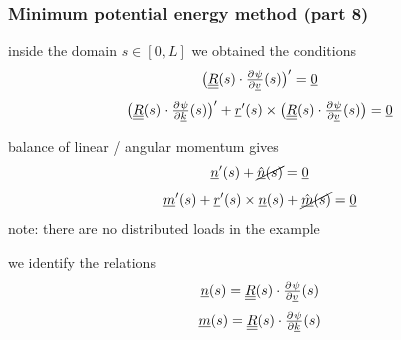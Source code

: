 \begin{frame}
  \frametitle{Minimum potential energy method (part 8)}
  
  inside the domain $s \in [0,L]$ we obtained the conditions
  \begin{displaymath}
    \bigl( \doubleunderline{R}(s) \cdot \pd{\psi}{\underline{v}}(s) \bigr)^{\prime} = \underline{0}
  \end{displaymath}
  \begin{displaymath}
    \bigl( \doubleunderline{R}(s) \cdot \pd{\psi}{\underline{k}}(s) \bigr)^{\prime} +
        \underline{r}^{\prime}(s) \times \bigl( \doubleunderline{R}(s) \cdot \pd{\psi}{\underline{v}}(s)  \bigr) = \underline{0}
  \end{displaymath}
  
  \vspace{0.5em}
  balance of linear / angular momentum gives
  \begin{displaymath}
    \underline{n}^{\prime}(s) + \cancel{\underline{\hat{n}}(s)} = \underline{0}
  \end{displaymath}
  \begin{displaymath}
    \underline{m}^{\prime}(s) + \underline{r}^{\prime}(s) \times \underline{n}(s) + \cancel{\underline{\hat{m}}(s)} = \underline{0}
  \end{displaymath}
  note: there are no distributed loads in the example
    
  \vspace{0.5em}
  we identify the relations
  \begin{displaymath}
    \underline{n}(s) = \doubleunderline{R}(s) \cdot \pd{\psi}{\underline{v}}(s)
  \end{displaymath}
  \begin{displaymath}
    \underline{m}(s) = \doubleunderline{R}(s) \cdot \pd{\psi}{\underline{k}}(s)
  \end{displaymath}
\end{frame}


